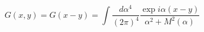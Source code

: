 \begin{equation}
G(x,y)=G(x-y)=\int \frac{d \alpha^{4}}{(2\pi)^{4}}\frac{\exp i\alpha(x-y)}{\alpha^{2}+M^{2}%
(\alpha)}\label{GA}
\end{equation}

